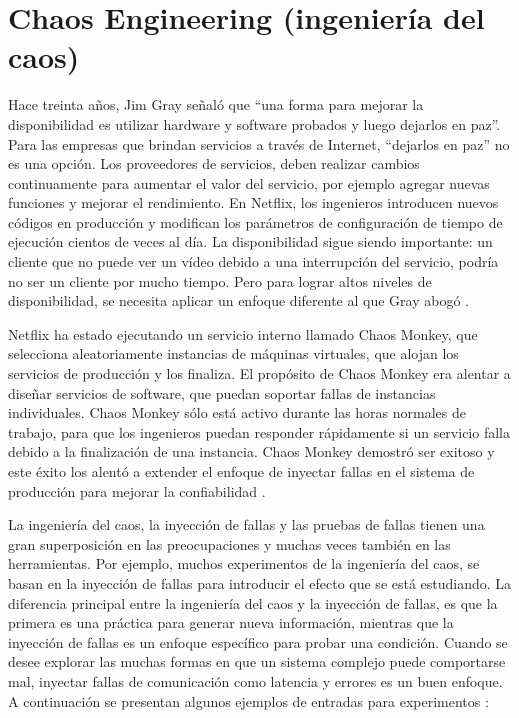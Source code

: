 \section{Chaos Engineering (ingeniería del caos)}
\par Hace treinta años, Jim Gray señaló que ``una forma para mejorar la disponibilidad es utilizar hardware y software probados y luego dejarlos en paz''. Para las empresas que brindan servicios a través de Internet, ``dejarlos en paz'' no es una opción. Los proveedores de servicios, deben realizar cambios continuamente para aumentar el valor del servicio, por ejemplo agregar nuevas funciones y mejorar el rendimiento. En Netflix, los ingenieros introducen nuevos códigos en producción y modifican los parámetros de configuración de tiempo de ejecución cientos de veces al día. La disponibilidad sigue siendo importante: un cliente que no puede ver un vídeo debido a una interrupción del servicio, podría no ser un cliente por mucho tiempo. Pero para lograr altos niveles de disponibilidad, se necesita aplicar un enfoque diferente al que Gray abogó \cite{LIB02}.\\
\par Netflix ha estado ejecutando un servicio interno llamado Chaos Monkey, que selecciona aleatoriamente instancias de máquinas virtuales, que alojan los servicios de producción y los finaliza. El propósito de Chaos Monkey era alentar a diseñar servicios de software, que puedan soportar fallas de instancias individuales. Chaos Monkey sólo está activo durante las horas normales de trabajo, para que los ingenieros puedan responder rápidamente si un servicio falla debido a la finalización de una instancia. Chaos Monkey demostró ser exitoso y este éxito los alentó a extender el enfoque de inyectar fallas en el sistema de producción para mejorar la confiabilidad \cite{LIB02}.\\
\par La ingeniería del caos, la inyección de fallas y las pruebas de fallas tienen una gran superposición en las preocupaciones y muchas veces también en las herramientas. Por ejemplo, muchos experimentos de la ingeniería del caos, se basan en la inyección de fallas para introducir el efecto que se está estudiando. La diferencia principal entre la ingeniería del caos y la inyección de fallas, es que la primera es una práctica para generar nueva información, mientras que la inyección de fallas es un enfoque específico para probar una condición. Cuando se desee explorar las muchas formas en que un sistema complejo puede comportarse mal, inyectar fallas de comunicación como latencia y errores es un buen enfoque. A continuación se presentan algunos ejemplos de entradas para experimentos \cite{LIB06}:
